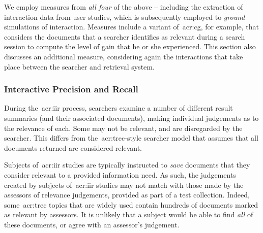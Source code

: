 We employ measures from \emph{all four} of the above -- including the extraction of interaction data from user studies, which is subsequently employed to \emph{ground} simulations of interaction. Measures include a variant of~\gls{acr:cg}, for example, that considers the documents that a searcher identifies as relevant during a search session to compute the level of gain that he or she experienced. This section also discusses an additional measure, considering again the interactions that take place between the searcher and retrieval system.

%
%

\subsubsection{Interactive Precision and Recall}\label{sec:ir_background:evaluation:user:ipr}
During the~\gls{acr:iir} process, searchers examine a number of different result summaries (and their associated documents), making individual judgements as to the relevance of each. Some may not be relevant, and are disregarded by the searcher. This differs from the~\gls{acr:trec}-style searcher model that assumes that all documents returned are considered relevant.

Subjects of~\gls{acr:iir} studies are typically instructed to \emph{save} documents that they consider relevant to a provided information need. As such, the judgements created by subjects of~\gls{acr:iir} studies may not match with those made by the assessors of relevance judgements, provided as part of a test collection. Indeed, some~\gls{acr:trec} topics that are widely used contain hundreds of documents marked as relevant by assessors. It is unlikely that a subject would be able to find \emph{all} of these documents, or agree with an assessor's judgement.

